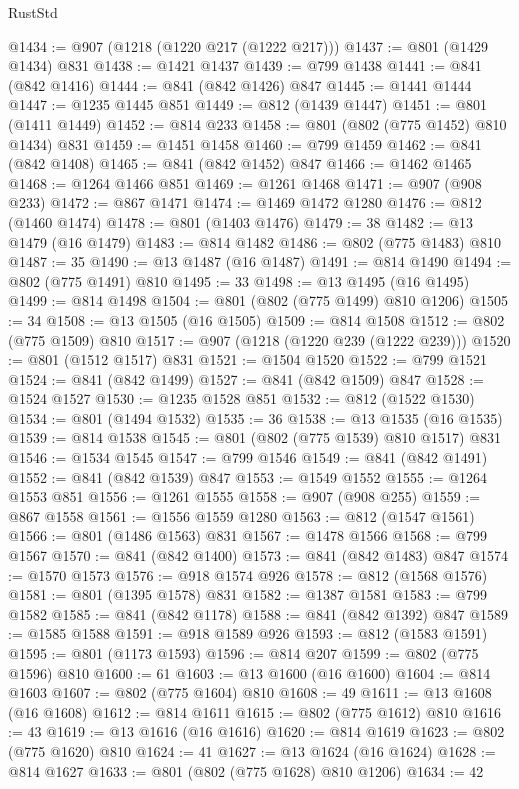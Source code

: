 \begin{lexlean}{RustStd}
\begin{coremodule}
{\begin{coremodule}
{{{{{@1434 := @907 (@1218 (@1220 @217 (@1222 @217)))
@1437 := @801 (@1429 @1434) @831
@1438 := @1421 @1437
@1439 := @799 @1438
@1441 := @841 (@842 @1416)
@1444 := @841 (@842 @1426) @847
@1445 := @1441 @1444
@1447 := @1235 @1445 @851
@1449 := @812 (@1439 @1447)
@1451 := @801 (@1411 @1449)
@1452 := @814 @233
@1458 := @801 (@802 (@775 @1452) @810 @1434) @831
@1459 := @1451 @1458
@1460 := @799 @1459
@1462 := @841 (@842 @1408)
@1465 := @841 (@842 @1452) @847
@1466 := @1462 @1465
@1468 := @1264 @1466 @851
@1469 := @1261 @1468
@1471 := @907 (@908 @233)
@1472 := @867 @1471
@1474 := @1469 @1472 @1280
@1476 := @812 (@1460 @1474)
@1478 := @801 (@1403 @1476)
@1479 := 38
@1482 := @13 @1479 (@16 @1479)
@1483 := @814 @1482
@1486 := @802 (@775 @1483) @810
@1487 := 35
@1490 := @13 @1487 (@16 @1487)
@1491 := @814 @1490
@1494 := @802 (@775 @1491) @810
@1495 := 33
@1498 := @13 @1495 (@16 @1495)
@1499 := @814 @1498
@1504 := @801 (@802 (@775 @1499) @810 @1206)
@1505 := 34
@1508 := @13 @1505 (@16 @1505)
@1509 := @814 @1508
@1512 := @802 (@775 @1509) @810
@1517 := @907 (@1218 (@1220 @239 (@1222 @239)))
@1520 := @801 (@1512 @1517) @831
@1521 := @1504 @1520
@1522 := @799 @1521
@1524 := @841 (@842 @1499)
@1527 := @841 (@842 @1509) @847
@1528 := @1524 @1527
@1530 := @1235 @1528 @851
@1532 := @812 (@1522 @1530)
@1534 := @801 (@1494 @1532)
@1535 := 36
@1538 := @13 @1535 (@16 @1535)
@1539 := @814 @1538
@1545 := @801 (@802 (@775 @1539) @810 @1517) @831
@1546 := @1534 @1545
@1547 := @799 @1546
@1549 := @841 (@842 @1491)
@1552 := @841 (@842 @1539) @847
@1553 := @1549 @1552
@1555 := @1264 @1553 @851
@1556 := @1261 @1555
@1558 := @907 (@908 @255)
@1559 := @867 @1558
@1561 := @1556 @1559 @1280
@1563 := @812 (@1547 @1561)
@1566 := @801 (@1486 @1563) @831
@1567 := @1478 @1566
@1568 := @799 @1567
@1570 := @841 (@842 @1400)
@1573 := @841 (@842 @1483) @847
@1574 := @1570 @1573
@1576 := @918 @1574 @926
@1578 := @812 (@1568 @1576)
@1581 := @801 (@1395 @1578) @831
@1582 := @1387 @1581
@1583 := @799 @1582
@1585 := @841 (@842 @1178)
@1588 := @841 (@842 @1392) @847
@1589 := @1585 @1588
@1591 := @918 @1589 @926
@1593 := @812 (@1583 @1591)
@1595 := @801 (@1173 @1593)
@1596 := @814 @207
@1599 := @802 (@775 @1596) @810
@1600 := 61
@1603 := @13 @1600 (@16 @1600)
@1604 := @814 @1603
@1607 := @802 (@775 @1604) @810
@1608 := 49
@1611 := @13 @1608 (@16 @1608)
@1612 := @814 @1611
@1615 := @802 (@775 @1612) @810
@1616 := 43
@1619 := @13 @1616 (@16 @1616)
@1620 := @814 @1619
@1623 := @802 (@775 @1620) @810
@1624 := 41
@1627 := @13 @1624 (@16 @1624)
@1628 := @814 @1627
@1633 := @801 (@802 (@775 @1628) @810 @1206)
@1634 := 42
}}}}}
\end{coremodule}}
\end{coremodule}
\end{lexlean}
